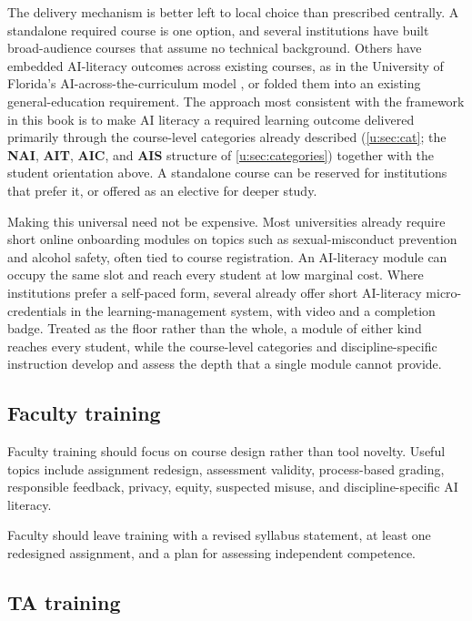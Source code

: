 \documentclass{SIAMbook2023}
\newcommand{\NAI}{\textcolor{catNAI}{\textbf{NAI}}}
\newcommand{\AIT}{\textcolor{catAIT}{\textbf{AIT}}}
\newcommand{\AIC}{\textcolor{catAIC}{\textbf{AIC}}}
\newcommand{\AIS}{\textcolor{catAIS}{\textbf{AIS}}}
\begin{document}
The delivery mechanism is better left to local choice than prescribed centrally. A standalone required course is one option, and several institutions have built broad-audience courses that assume no technical background. Others have embedded AI-literacy outcomes across existing courses, as in the University of Florida's AI-across-the-curriculum model \citep{southworth2023developing}, or folded them into an existing general-education requirement. The approach most consistent with the framework in this book is to make AI literacy a required learning outcome delivered primarily through the course-level categories already described (\cref{u:sec:cat}; the \NAI{}, \AIT{}, \AIC{}, and \AIS{} structure of \cref{u:sec:categories}) together with the student orientation above. A standalone course can be reserved for institutions that prefer it, or offered as an elective for deeper study.

Making this universal need not be expensive. Most universities already require short online onboarding modules on topics such as sexual-misconduct prevention and alcohol safety, often tied to course registration. An AI-literacy module can occupy the same slot and reach every student at low marginal cost. Where institutions prefer a self-paced form, several already offer short AI-literacy micro-credentials in the learning-management system, with video and a completion badge. Treated as the floor rather than the whole, a module of either kind reaches every student, while the course-level categories and discipline-specific instruction develop and assess the depth that a single module cannot provide.

\subsection{Faculty training}
\label{u:subsec:faculty-training}%

Faculty training should focus on course design rather than tool novelty. Useful topics include assignment redesign, assessment validity, process-based grading, responsible feedback, privacy, equity, suspected misuse, and discipline-specific AI literacy.

Faculty should leave training with a revised syllabus statement, at least one redesigned assignment, and a plan for assessing independent competence.

\subsection{TA training}
\label{u:subsec:ta-training}
\end{document}
